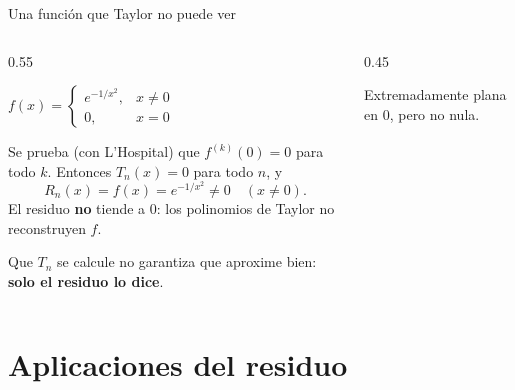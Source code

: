 \documentclass[10pt,aspectratio=169]{beamer}
\begin{document}
\begin{frame}{Una función que Taylor no puede ver}
  \begin{columns}
    \begin{column}{0.55\textwidth}
      \begin{ejemplo}[5]
        $f(x)=\begin{cases}e^{-1/x^2},&x\neq0\\0,&x=0\end{cases}$
        \medskip

        Se prueba (con L'Hospital) que $f^{(k)}(0)=0$ para todo $k$. Entonces $T_n(x)=0$ para todo $n$, y
        \[ R_n(x)=f(x)=e^{-1/x^2}\neq0\quad(x\neq0). \]
        El residuo \textbf{no} tiende a $0$: los polinomios de Taylor no reconstruyen $f$.
      \end{ejemplo}
      \begin{idea}
        Que $T_n$ se calcule no garantiza que aproxime bien: \textbf{solo el residuo lo dice}.
      \end{idea}
    \end{column}
    \begin{column}{0.45\textwidth}
      \centering

      \small Extremadamente plana en $0$, pero no nula.
    \end{column}
  \end{columns}
\end{frame}

\section{Aplicaciones del residuo}
\end{document}
